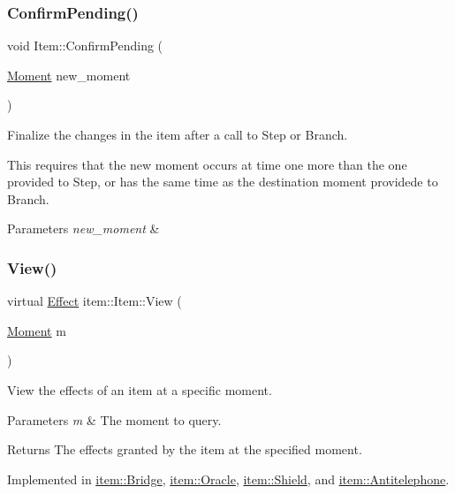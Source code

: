 \subsubsection{\texorpdfstring{Confirm\+Pending()}{ConfirmPending()}}
{\footnotesize\ttfamily void Item\+::\+Confirm\+Pending (\begin{DoxyParamCaption}\item[{\hyperlink{classtimeplane_1_1_moment}{Moment}}]{new\+\_\+moment }\end{DoxyParamCaption})}



Finalize the changes in the item after a call to {\ttfamily Step} or {\ttfamily Branch}. 

This requires that the new moment occurs at time one more than the one provided to {\ttfamily Step}, or has the same time as the destination moment providede to {\ttfamily Branch}. 
\begin{DoxyParams}{Parameters}
{\em new\+\_\+moment} & \\
\hline
\end{DoxyParams}
\mbox{\label{classitem_1_1_item_a400dfeabc4056d36bfd348ff9c51cf7d}} 
\subsubsection{\texorpdfstring{View()}{View()}}
{\footnotesize\ttfamily virtual \hyperlink{classitem_1_1_effect}{Effect} item\+::\+Item\+::\+View (\begin{DoxyParamCaption}\item[{\hyperlink{classtimeplane_1_1_moment}{Moment}}]{m }\end{DoxyParamCaption})\hspace{0.3cm}{\ttfamily [pure virtual]}}



View the effects of an item at a specific moment. 


\begin{DoxyParams}{Parameters}
{\em m} & The moment to query. \\
\hline
\end{DoxyParams}
\begin{DoxyReturn}{Returns}
The effects granted by the item at the specified moment. 
\end{DoxyReturn}


Implemented in \hyperlink{classitem_1_1_bridge_a7d579da1f368ba6a6b5dfd41de833f17}{item\+::\+Bridge}, \hyperlink{classitem_1_1_oracle_a9982f1934a769cc461246bab31b8a72d}{item\+::\+Oracle}, \hyperlink{classitem_1_1_shield_abdc88bd6d0a4d6021805fa3097f47633}{item\+::\+Shield}, and \hyperlink{classitem_1_1_antitelephone_aa44819e9242edbdfdfc4f14b5d2b34ec}{item\+::\+Antitelephone}.

